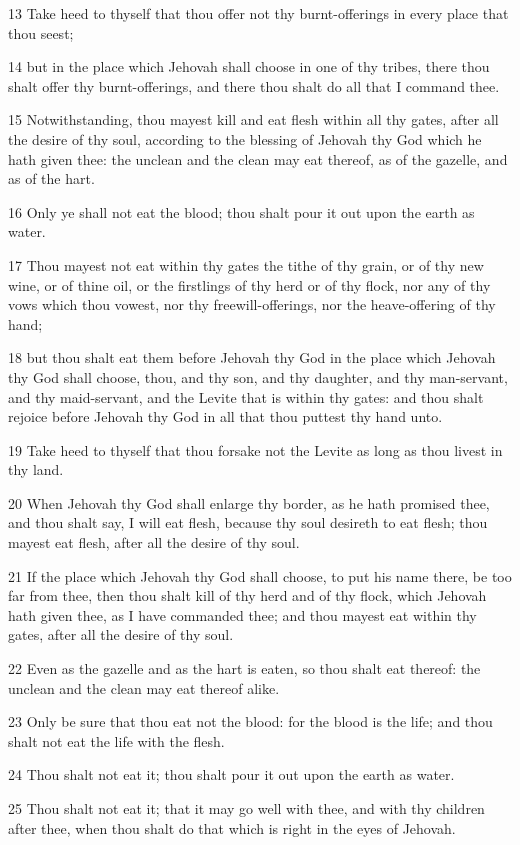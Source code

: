 \par 13 Take heed to thyself that thou offer not thy burnt-offerings in every place that thou seest;
\par 14 but in the place which Jehovah shall choose in one of thy tribes, there thou shalt offer thy burnt-offerings, and there thou shalt do all that I command thee.
\par 15 Notwithstanding, thou mayest kill and eat flesh within all thy gates, after all the desire of thy soul, according to the blessing of Jehovah thy God which he hath given thee: the unclean and the clean may eat thereof, as of the gazelle, and as of the hart.
\par 16 Only ye shall not eat the blood; thou shalt pour it out upon the earth as water.
\par 17 Thou mayest not eat within thy gates the tithe of thy grain, or of thy new wine, or of thine oil, or the firstlings of thy herd or of thy flock, nor any of thy vows which thou vowest, nor thy freewill-offerings, nor the heave-offering of thy hand;
\par 18 but thou shalt eat them before Jehovah thy God in the place which Jehovah thy God shall choose, thou, and thy son, and thy daughter, and thy man-servant, and thy maid-servant, and the Levite that is within thy gates: and thou shalt rejoice before Jehovah thy God in all that thou puttest thy hand unto.
\par 19 Take heed to thyself that thou forsake not the Levite as long as thou livest in thy land.
\par 20 When Jehovah thy God shall enlarge thy border, as he hath promised thee, and thou shalt say, I will eat flesh, because thy soul desireth to eat flesh; thou mayest eat flesh, after all the desire of thy soul.
\par 21 If the place which Jehovah thy God shall choose, to put his name there, be too far from thee, then thou shalt kill of thy herd and of thy flock, which Jehovah hath given thee, as I have commanded thee; and thou mayest eat within thy gates, after all the desire of thy soul.
\par 22 Even as the gazelle and as the hart is eaten, so thou shalt eat thereof: the unclean and the clean may eat thereof alike.
\par 23 Only be sure that thou eat not the blood: for the blood is the life; and thou shalt not eat the life with the flesh.
\par 24 Thou shalt not eat it; thou shalt pour it out upon the earth as water.
\par 25 Thou shalt not eat it; that it may go well with thee, and with thy children after thee, when thou shalt do that which is right in the eyes of Jehovah.
